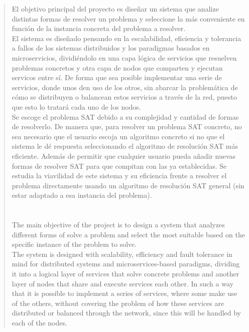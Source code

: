 \documentclass[11pt]{article}
\begin{document}
	\tableofcontents
	\newpage
	\begin{abstract}
		El objetivo principal del proyecto es diseñar un sistema que analize distintas formas de resolver un problema y seleccione la más conveniente en función 
		de la instancia concreta del problema a resolver. \\ 
		El sistema es diseñado pensando en la escalabilidad, eficiencia y tolerancia a fallos de los sistemas distribuidos y los paradigmas basados en microservicios, dividiéndolo
		en una capa lógica de servicios que resuelven problemas concretos y otra capa de nodos que comparten y ejecutan servicos entre sí.
		De forma que sea posible implementar una serie de servicios, donde unos den uso de los otros, sin abarcar la problemática de cómo se distribuyen o balancean estos servicios 
		a través de la red, puesto que esto lo tratará cada uno de los nodos. \\

		Se escoge el problema SAT debido a su complejidad y cantidad de formas de resolverlo. De manera que, para resolver 
		un problema SAT concreto, no sea necesario que el usuario escoja un algoritmo concreto si no que el sistema le dé respuesta seleccionando el algoritmo de resolución SAT más eficiente.
		Además de permitir que cualquier usuario pueda añadir nuevas formas de resolver SAT para que compitan con las ya establecidas. Se estudia la viavilidad de este sistema y su eficiencia 
		frente a resolver el problema directamente usando un algoritmo de resolución SAT general (sin estar adaptado a esa instancia del problema). \\ \\ \\

		The main objective of the project is to design a system that analyzes different forms of
		solve a problem and select the most suitable based on the specific instance of the
		problem to solve. \\
		The system is designed with scalability, efficiency and fault tolerance in mind for distributed systems and microservices-based paradigms, dividing it into a logical layer
		of services that solve concrete problems and another layer of nodes that share and execute
		services each other.
		In such a way that it is possible to implement a series of services, where some make use of the others,
		without covering the problem of how these services are distributed or balanced through the
		network, since this will be handled by each of the nodes. \\
		

\end{abstract}
\end{document}

